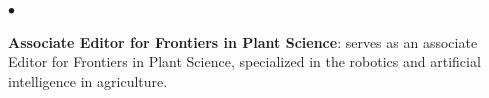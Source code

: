 \documentclass[margin,line]{res}
\newenvironment{list2}{
  \begin{list}{$\bullet$}{%
      \setlength{\itemsep}{0in}
      \setlength{\parsep}{0in} \setlength{\parskip}{0in}
      \setlength{\topsep}{0in} \setlength{\partopsep}{0in} 
      \setlength{\leftmargin}{0.2in}}}{\end{list}}
\begin{document}
\begin{resume}
\begin{list2}
\item {\bf Associate Editor for Frontiers in Plant Science}: serves as an associate Editor for Frontiers in Plant Science, specialized in the robotics and artificial intelligence in agriculture. \\

\end{list2}





%


%



\end{resume}
\end{document}
